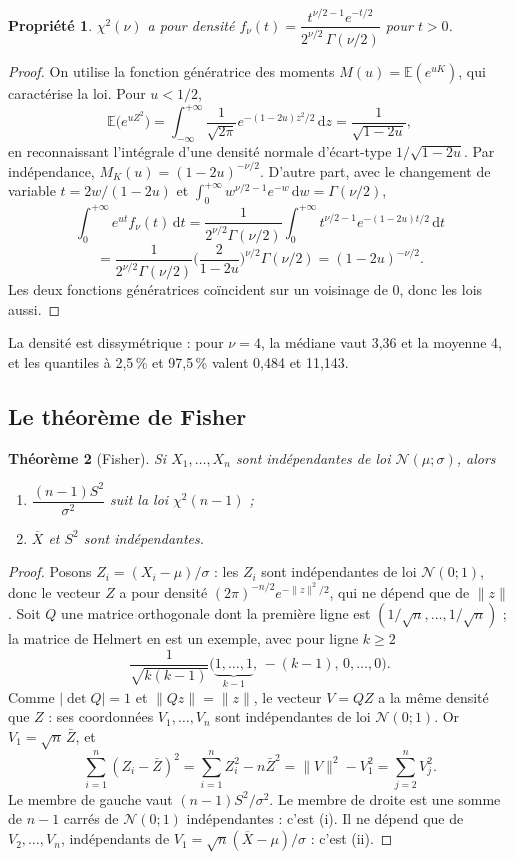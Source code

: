 \documentclass[11pt,a4paper]{article}
\theoremstyle{sj}
\newtheorem{thm}{Théorème}
\newtheorem{prop}[thm]{Propriété}
\theoremstyle{definition}
\theoremstyle{remark}
\newcommand{\E}{\mathbb{E}}
\newcommand{\N}{\mathcal{N}}
\newcommand{\Xb}{\overline{X}}
\newcommand{\dd}{\,\mathrm{d}}
\newcommand{\chid}{\chi^2}
\begin{document}
\begin{prop}
$\chid(\nu)$ a pour densité $f_\nu(t)=\dfrac{t^{\nu/2-1}e^{-t/2}}{2^{\nu/2}\,\Gamma(\nu/2)}$ pour $t>0$.
\end{prop}

\begin{proof}
On utilise la fonction génératrice des moments $M(u)=\E(e^{uK})$, qui caractérise la loi. Pour $u<1/2$,
\[
\E\big(e^{uZ^2}\big)=\int_{-\infty}^{+\infty}\frac{1}{\sqrt{2\pi}}e^{-(1-2u)z^2/2}\dd z=\frac{1}{\sqrt{1-2u}},
\]
en reconnaissant l'intégrale d'une densité normale d'écart-type $1/\sqrt{1-2u}$. Par indépendance, $M_K(u)=(1-2u)^{-\nu/2}$. D'autre part, avec le changement de variable $t=2w/(1-2u)$ et $\int_0^{+\infty}w^{\nu/2-1}e^{-w}\dd w=\Gamma(\nu/2)$,
\[
\int_0^{+\infty}e^{ut}f_\nu(t)\dd t=\frac{1}{2^{\nu/2}\Gamma(\nu/2)}\int_0^{+\infty}t^{\nu/2-1}e^{-(1-2u)t/2}\dd t
\]
\[
=\frac{1}{2^{\nu/2}\Gamma(\nu/2)}\Big(\frac{2}{1-2u}\Big)^{\nu/2}\Gamma(\nu/2)=(1-2u)^{-\nu/2}.
\]
Les deux fonctions génératrices coïncident sur un voisinage de 0, donc les lois aussi.
\end{proof}

La densité est dissymétrique : pour $\nu=4$, la médiane vaut 3,36 et la moyenne 4, et les quantiles à 2,5\,\% et 97,5\,\% valent 0,484 et 11,143.

\subsection{Le théorème de Fisher}

\begin{thm}[Fisher]\label{thm:fisher}
Si $X_1,\dots,X_n$ sont indépendantes de loi $\N(\mu;\sigma)$, alors
\begin{enumerate}[label=(\roman*),leftmargin=2em]
\item $\dfrac{(n-1)S^2}{\sigma^2}$ suit la loi $\chid(n-1)$ ;
\item $\Xb$ et $S^2$ sont indépendantes.
\end{enumerate}
\end{thm}

\begin{proof}
Posons $Z_i=(X_i-\mu)/\sigma$ : les $Z_i$ sont indépendantes de loi $\N(0;1)$, donc le vecteur $Z$ a pour densité $(2\pi)^{-n/2}e^{-\|z\|^2/2}$, qui ne dépend que de $\|z\|$. Soit $Q$ une matrice orthogonale dont la première ligne est $(1/\sqrt n,\dots,1/\sqrt n)$ ; la matrice de Helmert en est un exemple, avec pour ligne $k\ge2$
\[
\frac{1}{\sqrt{k(k-1)}}\big(\underbrace{1,\dots,1}_{k-1},\,-(k-1),\,0,\dots,0\big).
\]
Comme $|\det Q|=1$ et $\|Qz\|=\|z\|$, le vecteur $V=QZ$ a la même densité que $Z$ : ses coordonnées $V_1,\dots,V_n$ sont indépendantes de loi $\N(0;1)$. Or $V_1=\sqrt n\,\bar Z$, et
\[
\sum_{i=1}^n(Z_i-\bar Z)^2=\sum_{i=1}^nZ_i^2-n\bar Z^2=\|V\|^2-V_1^2=\sum_{j=2}^nV_j^2.
\]
Le membre de gauche vaut $(n-1)S^2/\sigma^2$. Le membre de droite est une somme de $n-1$ carrés de $\N(0;1)$ indépendantes : c'est (i). Il ne dépend que de $V_2,\dots,V_n$, indépendants de $V_1=\sqrt n(\Xb-\mu)/\sigma$ : c'est (ii).
\end{proof}
\end{document}
